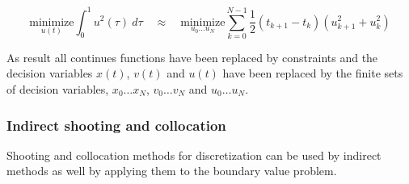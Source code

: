 \begin{equation}
    \underset{u(t)}{\text{minimize}} \int_{0}^{1}  u^2(\tau)\ d\tau
    \quad\approx\quad
    \underset{u_0\dots u_N}{\text{minimize}}\sum_{k=0}^{N-1}\frac{1}{2} (t_{k+1} - t_k) (u_{k+1}^2 + u_k^2)
\end{equation}

As result all continues functions have been replaced by constraints and the decision variables $x(t)$, $v(t)$ and $u(t)$ have been replaced by the finite sets of decision variables, $x_0\dots x_N$, $v_0\dots v_N$ and $u_0\dots u_N$.

\subsubsection{Indirect shooting and collocation}
Shooting and collocation methods for discretization can be used by indirect methods as well by applying them to the boundary value problem.
